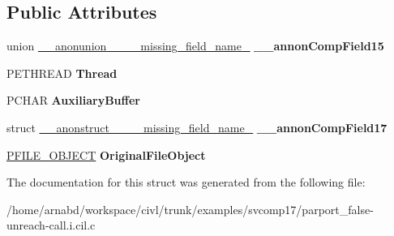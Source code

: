 \subsection*{Public Attributes}
\begin{DoxyCompactItemize}
\item 
\hypertarget{struct____anonstruct__Overlay__48_ae240f667ba5b7cddb2a41f88e5ab1e60}{}union \hyperlink{union____anonunion________missing__field__name__49}{\+\_\+\+\_\+anonunion\+\_\+\+\_\+\+\_\+\+\_\+missing\+\_\+field\+\_\+name\+\_} {\bfseries \+\_\+\+\_\+annon\+Comp\+Field15}\label{struct____anonstruct__Overlay__48_ae240f667ba5b7cddb2a41f88e5ab1e60}

\item 
\hypertarget{struct____anonstruct__Overlay__48_a1c4d94381f82f2085286a4fce1cd0303}{}P\+E\+T\+H\+R\+E\+A\+D {\bfseries Thread}\label{struct____anonstruct__Overlay__48_a1c4d94381f82f2085286a4fce1cd0303}

\item 
\hypertarget{struct____anonstruct__Overlay__48_a53dcf463662f3b17dba1c3f7ad3a479d}{}P\+C\+H\+A\+R {\bfseries Auxiliary\+Buffer}\label{struct____anonstruct__Overlay__48_a53dcf463662f3b17dba1c3f7ad3a479d}

\item 
\hypertarget{struct____anonstruct__Overlay__48_a842bb54d34cba74cc1e5f06a1f7104d1}{}struct \hyperlink{struct____anonstruct________missing__field__name__51}{\+\_\+\+\_\+anonstruct\+\_\+\+\_\+\+\_\+\+\_\+missing\+\_\+field\+\_\+name\+\_} {\bfseries \+\_\+\+\_\+annon\+Comp\+Field17}\label{struct____anonstruct__Overlay__48_a842bb54d34cba74cc1e5f06a1f7104d1}

\item 
\hypertarget{struct____anonstruct__Overlay__48_a99f11a7eec87cfa13ae12c41cc85dd76}{}\hyperlink{struct__FILE__OBJECT}{P\+F\+I\+L\+E\+\_\+\+O\+B\+J\+E\+C\+T} {\bfseries Original\+File\+Object}\label{struct____anonstruct__Overlay__48_a99f11a7eec87cfa13ae12c41cc85dd76}

\end{DoxyCompactItemize}


The documentation for this struct was generated from the following file\+:\begin{DoxyCompactItemize}
\item 
/home/arnabd/workspace/civl/trunk/examples/svcomp17/parport\+\_\+false-\/unreach-\/call.\+i.\+cil.\+c\end{DoxyCompactItemize}

